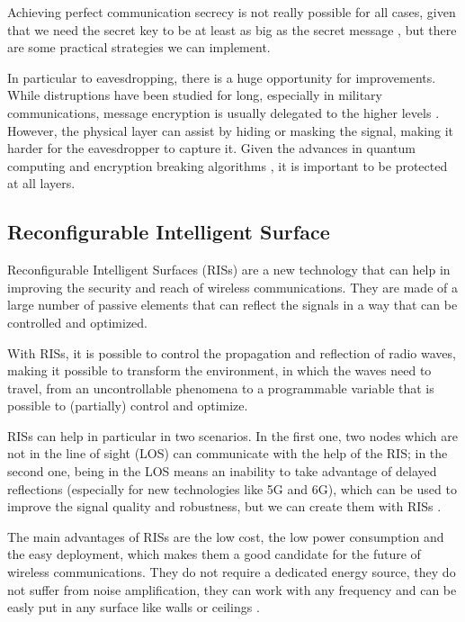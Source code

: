 
Achieving perfect communication secrecy is not really possible for all cases, given that we need the secret key to be at least as big as the secret message \cite{6769090}, but there are some practical strategies we can implement.

In particular to eavesdropping, there is a huge opportunity for improvements. While distruptions have been studied for long, especially in military communications, message encryption is usually delegated to the higher levels \cite{6739367}. However, the physical layer can assist by hiding or masking the signal, making it harder for the eavesdropper to capture it. Given the advances in quantum computing and encryption breaking algorithms \cite{365700}, it is important to be protected at all layers.

\subsection{Reconfigurable Intelligent Surface}

Reconfigurable Intelligent Surfaces (RISs) are a new technology that can help in improving the security and reach of wireless communications. They are made of a large number of passive elements that can reflect the signals in a way that can be controlled and optimized.

With RISs, it is possible to control the propagation and reflection of radio waves, making it possible to transform the environment, in which the waves need to travel, from an uncontrollable phenomena to a programmable variable that is possible to (partially) control and optimize.

RISs can help in particular in two scenarios. In the first one, two nodes which are not in the line of sight (LOS) can communicate with the help of the RIS; in the second one, being in the LOS means an inability to take advantage of delayed reflections (especially for new technologies like 5G and 6G), which can be used to improve the signal quality and robustness, but we can create them with RISs \cite{9086766}.

The main advantages of RISs are the low cost, the low power consumption and the easy deployment, which makes them a good candidate for the future of wireless communications. They do not require a dedicated energy source, they do not suffer from noise amplification, they can work with any frequency and can be easly put in any surface like walls or ceilings \cite{8796365}.

